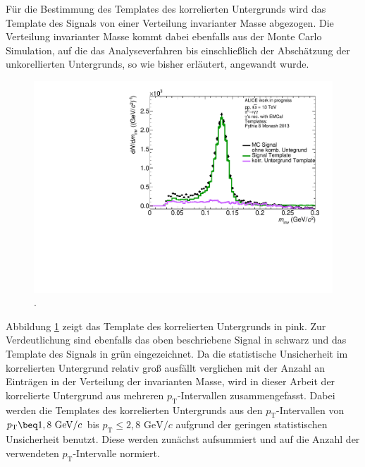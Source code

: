 F\"ur die Bestimmung des Templates des korrelierten Untergrunds wird das Template des Signals von einer Verteilung invarianter Masse abgezogen.
Die Verteilung invarianter Masse kommt dabei ebenfalls aus der Monte Carlo Simulation, auf die das Analyseverfahren bis einschlie{\ss}lich der Absch\"atzung der unkorellierten Untergrunds, so wie bisher erl\"autert, angewandt wurde.
\begin{figure}[tp]
\centering
\includegraphics[width=.75\linewidth]{EntstehungUntergrund10_Data_2016.pdf}
\caption{.}
\label{fig:BkgTemp}
\end{figure}
\newline
Abbildung \ref{fig:BkgTemp} zeigt das Template des korrelierten Untergrunds in pink.
Zur Verdeutlichung sind ebenfalls das oben beschriebene Signal in schwarz und das Template des Signals in gr\"un eingezeichnet.
\newline
Da die statistische Unsicherheit im korrelierten Untergrund relativ gro{\ss} ausf\"allt verglichen mit der Anzahl an Eintr\"agen in der Verteilung der invarianten Masse, wird in dieser Arbeit der korrelierte Untergrund aus mehreren $p_\text{T}$-Intervallen zusammengefasst.
Dabei werden die Templates des korrelierten Untergrunds aus den $p_\text{T}$-Intervallen von $p_\text{T} \beq 1,8\text{ GeV}/c$ bis $p_\text{T} \leq 2,8\text{ GeV}/c$ aufgrund der geringen statistischen Unsicherheit benutzt.
Diese werden zun\"achst aufsummiert und auf die Anzahl der verwendeten $p_\text{T}$-Intervalle normiert.
